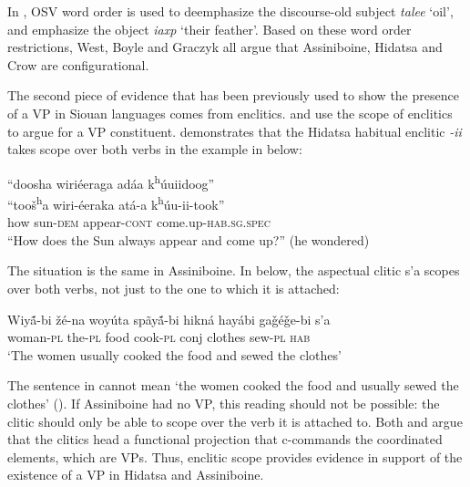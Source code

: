 \documentclass[output=paper]{LSP/langsci}
\begin{document}
In , OSV word order is used to deemphasize the discourse-old subject \textit{talee} `oil', and emphasize the object \textit{iaxp} `their feather'.  Based on these word order restrictions, West, Boyle and Graczyk all argue that Assiniboine, Hidatsa and Crow are configurational. 
	
The second piece of evidence that has been previously used to show the presence of a VP in Siouan languages comes from enclitics. \citet{West2003} and \citet{Boyle2007} use the scope of enclitics to argue for a VP constituent. \citet{Boyle2007} demonstrates that the Hidatsa habitual enclitic \textit{-ii} takes scope over both verbs in the example in  below:

\begin{exe}
\ex 
\glll ``doosha	wiri\'eeraga 	ad\'aa 	 k\textsuperscript{h}\'uuiidoog''\\
``too\v{s}\textsuperscript{h}a 	wiri-\'eeraka 	at\'a-a k\textsuperscript{h}\'uu-ii-took'' \\
how 	sun-\textsc{dem} 	appear-\textsc{cont}  come.up-\textsc{hab.sg.spec} \\
\trans ``How does the Sun always appear and come up?'' (he wondered) \citep[223]{Boyle2007}
\end{exe}

The situation is the same in Assiniboine.  In  below, the aspectual clitic s'a scopes over both verbs, not just to the one to which it is attached:

\begin{exe}
\ex \gll Wiy\'{\~a}-bi 		\v{z}\'e-na 	woy\'uta 	sp\~ay\'{\~a}-bi 	hikn\'a 	hay\'abi 		ga\v{g}\'e\v{g}e-bi 	s'a \\
woman-\textsc{pl} the-\textsc{pl} 	food 	cook-\textsc{pl} 	conj 	clothes 	sew-\textsc{pl} 	\textsc{hab} \\
\trans `The women usually cooked the food and sewed the clothes' \citep[39]{West2003}
\end{exe}

The sentence in  cannot mean `the women cooked the food and usually sewed the clothes' (\citealt{West2003}).  If Assiniboine had no VP, this reading should not be possible: the clitic should only be able to scope over the verb it is attached to. Both \citet{Boyle2007} and \citet{West2003} argue that the clitics head a functional projection that c-commands the coordinated elements, which are VPs.  Thus, enclitic scope provides evidence in support of the existence of a VP in Hidatsa and Assiniboine.
	
\end{document}
